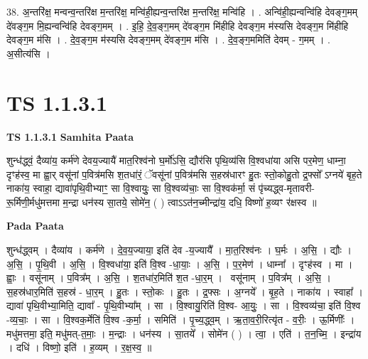 \documentclass[17pt]{extarticle}
\begin{document}
38. अ॒न्तरि॑क्ष॒ मन्वन्व॒न्तरि॑क्ष म॒न्तरि॑क्ष॒ मन्वि॑ही॒ह्यन्व॒न्तरि॑क्ष म॒न्तरि॑क्ष॒ मन्वि॑हि । . अन्वि॑ही॒ह्यन्वन्वि॑हि देवङ्ग॒मम् दे॑वङ्ग॒म मि॒ह्यन्वन्वि॑हि देवङ्ग॒मम् । . इ॒हि॒ दे॒व॒ङ्ग॒मम् दे॑वङ्ग॒म मि॑हीहि देवङ्ग॒म म॑स्यसि देवङ्ग॒म मि॑हीहि देवङ्ग॒म म॑सि । . दे॒व॒ङ्ग॒म म॑स्यसि देवङ्ग॒मम् दे॑वङ्ग॒म म॑सि । . दे॒व॒ङ्ग॒ममिति॑ देवम् - ग॒मम् । . अ॒सीत्य॑सि । \newline
\pagebreak
{}
\section*{ TS 1.1.3.1 }

\textbf{TS 1.1.3.1 } \newline
\textbf{Samhita Paata} \newline

शुन्ध॑द्ध्वं॒ दैव्या॑य॒ कर्म॑णे देवय॒ज्यायै॑ मात॒रिश्व॑नो घ॒र्मो॑ऽसि॒ द्यौर॑सि पृथि॒व्य॑सि वि॒श्वधा॑या असि पर॒मेण॒ धाम्ना॒ दृꣳह॑स्व॒ मा ह्वा॒र् वसू॑नां प॒वित्र॑मसि श॒तधा॑रं॒ ॅवसू॑नां प॒वित्र॑मसि स॒हस्र॑धारꣳ हु॒तः स्तो॒कोहु॒तो द्र॒फ्सो᳚ ऽग्नये॑ बृह॒ते नाका॑य॒ स्वाहा॒ द्यावा॑पृथि॒वीभ्याꣳ॒॒ सा वि॒श्वायुः॒ सा वि॒श्वव्य॑चाः॒ सा वि॒श्वक॑र्मा॒ सं पृ॑च्यद्ध्व-मृतावरी-रू॒र्मिणी॒र्मधु॑मत्तमा म॒न्द्रा धन॑स्य सा॒तये॒ सोमे॑न॒ ( ) त्वाऽऽत॑न॒च्मीन्द्रा॑य॒ दधि॒ विष्णो॑ ह॒व्यꣳ र॑क्षस्व ॥ \newline

\textbf{Pada Paata} \newline

शुन्ध॑द्ध्वम् । दैव्या॑य । कर्म॑णे । दे॒व॒य॒ज्याया॒ इति॑ देव -य॒ज्यायै᳚ । मा॒त॒रिश्व॑नः । घ॒र्मः । अ॒सि॒ । द्यौः । अ॒सि॒ । पृ॒थि॒वी । अ॒सि॒ । वि॒श्वधा॑या॒ इति॑ वि॒श्व -धा॒याः॒ । अ॒सि॒ । प॒र॒मेण॑ । धाम्ना᳚ । दृꣳह॑स्व । मा । ह्वाः॒ । वसू॑नाम् । प॒वित्र᳚म् । अ॒सि॒ । श॒तधा॑र॒मिति॑ श॒त -धा॒र॒म् ।  वसू॑नाम् । प॒वित्र᳚म् । अ॒सि॒ । स॒हस्र॑धार॒मिति॑ स॒हस्र॑ - धा॒र॒म् । हु॒तः । स्तो॒कः । हु॒तः । द्र॒फ्सः । अ॒ग्नये᳚ । बृ॒ह॒ते । नाका॑य । स्वाहा᳚ । द्यावा॑ पृथि॒वीभ्या॒मिति॒ द्यावा᳚ - पृ॒थि॒वीभ्या᳚म् । सा । वि॒श्वायु॒रिति॑ वि॒श्व- आ॒युः॒ । सा । वि॒श्वव्य॑चा॒ इति॑ वि॒श्व -व्य॒चाः॒ । सा । वि॒श्वक॒र्मेति॑ वि॒श्व -क॒र्मा॒ । समिति॑ । पृ॒च्य॒द्ध्व॒म् । ऋ॒ता॒व॒री॒रित्यृ॑त - व॒रीः॒ । ऊ॒र्मिणीः᳚ । मधु॑मत्तमा॒ इति॒ मधु॑मत्-त॒माः॒ । म॒न्द्राः । धन॑स्य । सा॒तये᳚ । सोमे॑न ( ) । त्वा॒ । एति॑ । त॒न॒च्मि॒ । इन्द्रा॑य । दधि॑ । विष्णो॒ इति॑ । ह॒व्यम् । र॒क्ष॒स्व॒ ॥  \newline
\end{document}
